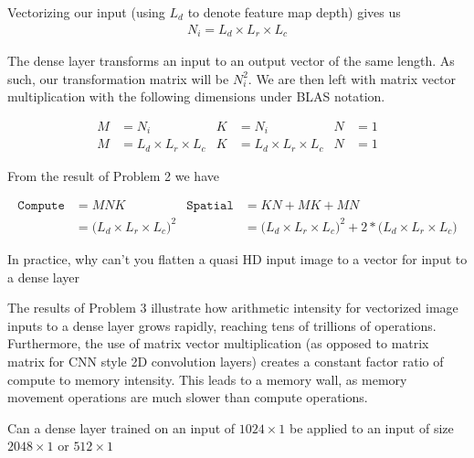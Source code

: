 \documentclass[11pt]{article}
\begin{document}
Vectorizing our input (using $L_d$ to denote feature map depth) gives us
\begin{align}
	N_i = L_d \times L_r \times L_c
\end{align}

The dense layer transforms an input to an output vector of the same length. As
such, our transformation matrix will be $N_i^2$. We are then left with matrix
vector multiplication with the following dimensions under BLAS notation.

\begin{align}
	M&=N_i & K&=N_i & N&=1 \\
	M&=L_d \times L_r \times L_c & K&=L_d \times L_r \times L_c & N&=1
\end{align}

From the result of Problem 2 we have

\begin{align}
	\texttt{Compute} &= M N K &
		\texttt{Spatial} &= KN + MK + MN \\
	&= \big(L_d \times L_r \times L_c\big)^2 &
		&= \big(L_d \times L_r \times L_c\big)^2 +  2* \big(L_d \times L_r \times L_c\big)
\end{align}

In practice, why can't you flatten a quasi HD input image to a vector for input
to a dense layer

\begin{solution}

	The results of Problem 3 illustrate how arithmetic intensity for vectorized
	image inputs to a dense layer grows rapidly, reaching tens of trillions of
	operations. Furthermore, the use of matrix
	vector multiplication (as opposed to matrix matrix for CNN style 2D
	convolution layers) creates a constant factor ratio of compute to memory
	intensity. This leads to a memory wall, as memory movement operations are
	much slower than compute operations.
\end{solution}

Can a dense layer trained on an input of $1024\times1$ be applied to an input
of size $2048\times1$ or $512\times1$
\end{document}
